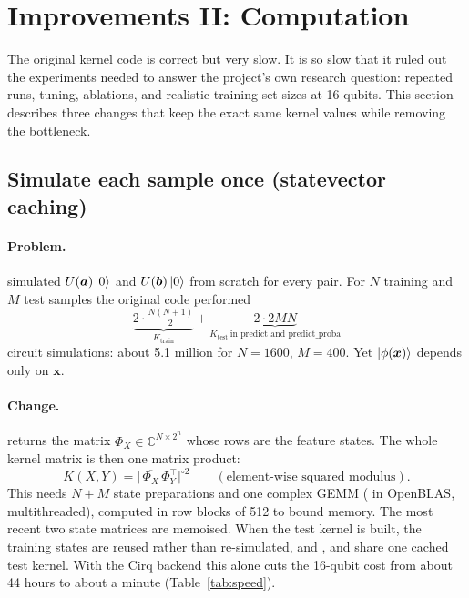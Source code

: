 \section{Improvements II: Computation}
\label{sec:impcompute}

The original kernel code is correct but very slow. It is so slow that it ruled out the
experiments needed to answer the project's own research question: repeated runs, tuning,
ablations, and realistic training-set sizes at 16 qubits. This section describes three changes
that keep the exact same kernel values while removing the bottleneck.

\subsection{Simulate each sample once (statevector caching)}
\paragraph{Problem.}  simulated $U(\bm a)\left|0\right\rangle$ and
$U(\bm b)\left|0\right\rangle$ from scratch for every pair. For $N$ training and $M$ test samples the original
code performed
\begin{equation}
\underbrace{2\cdot\tfrac{N(N+1)}{2}}_{K_\text{train}}+\underbrace{2\cdot 2MN}_{K_\text{test}\ \text{in predict and predict\_proba}}
\end{equation}
circuit simulations: about 5.1 million for $N=1600$, $M=400$. Yet $\left|\phi(\bm x)\right\rangle$ depends
only on $\bm x$.

\paragraph{Change.}  returns the matrix $\Phi_X\in\mathbb{C}^{N\times2^n}$
whose rows are the feature states. The whole kernel matrix is then one matrix product:
\begin{equation}
K(X,Y)=\big|\,\overline{\Phi_X}\,\Phi_Y^{\top}\big|^{\circ2}\qquad(\text{element-wise squared modulus}).
\label{eq:gram}
\end{equation}
This needs $N+M$ state preparations and one complex GEMM ( in OpenBLAS, multithreaded),
computed in row blocks of 512 to bound memory. The most recent two state matrices are memoised.
When the test kernel is built, the training states are reused rather than re-simulated, and
,  and  share one cached test
kernel. With the Cirq backend this alone cuts the 16-qubit cost from about 44 hours to about
a minute (Table~\ref{tab:speed}).

